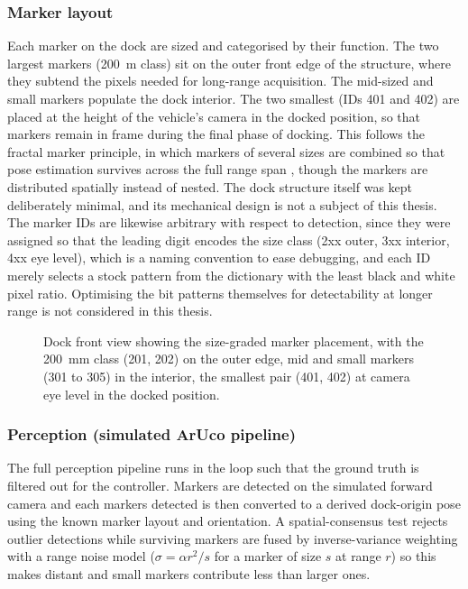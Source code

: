 \subsubsection{Marker layout}
\label{sec:method-layout}

Each marker on the dock are sized and categorised by their function. The two largest markers (200~m class) sit on the outer front edge of the structure, where they subtend the pixels needed for long-range acquisition. The mid-sized and small markers populate the dock interior. The two smallest (IDs 401 and 402) are placed at the height of the vehicle's camera in the docked position, so that markers remain in frame during the final phase of docking. This follows the fractal marker principle, in which markers of several sizes are combined so that pose estimation survives across the full range span \cite{romeroramirez2019fractal}, though the markers are distributed spatially instead of nested. The dock structure itself was kept deliberately minimal, and its mechanical design is not a subject of this thesis. The marker IDs are likewise arbitrary with respect to detection, since they were assigned so that the leading digit encodes the size class (2xx outer, 3xx interior, 4xx eye level), which is a naming convention to ease debugging, and each ID merely selects a stock pattern from the dictionary with the least black and white pixel ratio. Optimising the bit patterns themselves for detectability at longer range is not considered in this thesis.


\begin{figure}[H]
    \centering
    
    \caption{Dock front view showing the size-graded marker placement, with the
        200~mm class (201, 202) on the outer edge, mid and small markers
        (301 to 305) in the interior, the smallest pair (401, 402) at camera
        eye level in the docked position.}
    \label{fig:dock-layout}
\end{figure}

\subsubsection{Perception (simulated ArUco pipeline)}

The full perception pipeline runs in the loop such that the ground truth is filtered out for the controller. Markers are detected on the simulated forward camera and each markers detected is then converted to a derived dock-origin pose using the known marker layout and orientation. A spatial-consensus test rejects outlier detections while surviving markers are fused by inverse-variance weighting with a range noise model ($\sigma = \alpha r^2 / s$ for a marker of size $s$ at range $r$) so this makes distant and small markers contribute less than larger ones.


